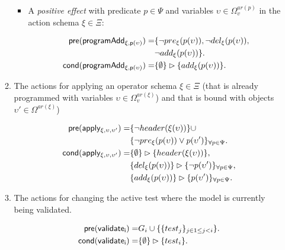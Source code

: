 \documentclass[letterpaper]{article} %
\newcommand{\pre}{\mathsf{pre}}     %
\newcommand{\cond}{\mathsf{cond}}   %
\begin{document}
\begin{itemize}
\begin{enumerate}
\begin{itemize}
\item A {\em positive effect} with predicate $p\in\Psi$ and variables $\upsilon\in\Omega_v^{ar(p)}$ in the action schema $\xi\in\Xi$:
\begin{small}
\begin{align*}
\hspace*{7pt}\pre(\mathsf{programAdd_{\xi,p(\upsilon)}})=&\{\neg pre_{\xi}(p(\upsilon)),\neg del_{\xi}(p(\upsilon)),\\
                                                     &\neg add_{\xi}(p(\upsilon))\}.\\                                                   
\cond(\mathsf{programAdd_{\xi,p(\upsilon)}})=&\{\emptyset\}\rhd\{add_{\xi}(p(\upsilon))\}.
\end{align*}
\end{small}
\end{itemize}

\item The actions for applying an operator schema $\xi\in\Xi$ (that is already programmed with variables $\upsilon\in\Omega_v^{ar(\xi)}$) and that is bound with objects $\upsilon'\in\Omega^{ar(\xi)}$)
\begin{small}
\begin{align*}
\hspace*{7pt}\pre(\mathsf{apply_{\xi,\upsilon,\upsilon'}})=&\{\neg header(\xi(\upsilon))\}\cup\\     
                                           &\{\neg pre_{\xi}(p(\upsilon))\vee p(\upsilon')\}_{\forall p\in\Psi}.\\
\cond(\mathsf{apply_{\xi,\upsilon,\upsilon'}})=&\{\emptyset\}\rhd\{header(\xi(\upsilon))\},\\
&\{del_{\xi}(p(\upsilon))\}\rhd\{\neg p(\upsilon')\}_{\forall p\in\Psi},\\
&\{add_{\xi}(p(\upsilon))\}\rhd\{p(\upsilon')\}_{\forall p\in\Psi}.
\end{align*}
\end{small}

\item The actions for changing the active test where the model is currently being validated.
\begin{small}
\begin{align*}
\hspace*{7pt}\pre(\mathsf{validate_{i}})=&G_i\cup\{\{test_j\}_{j\in 1\leq j<i}\}.\\
\cond(\mathsf{validate_{i}})=&\{\emptyset\}\rhd\{test_i\}.
\end{align*}
\end{small}
\end{enumerate}
\end{itemize}
\end{document}
